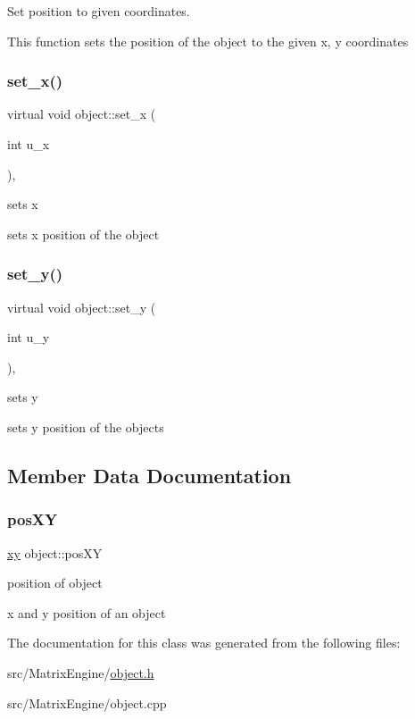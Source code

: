Set position to given coordinates. 

This function sets the position of the object to the given x, y coordinates \mbox{\label{classobject_a0520ed913c351f67b3abc458a5896833}} 
\subsubsection{\texorpdfstring{set\+\_\+x()}{set\_x()}}
{\footnotesize\ttfamily virtual void object\+::set\+\_\+x (\begin{DoxyParamCaption}\item[{int}]{u\+\_\+x }\end{DoxyParamCaption})\hspace{0.3cm}{\ttfamily [inline]}, {\ttfamily [virtual]}}



sets x 

sets x position of the object \mbox{\label{classobject_af2831ab422aedd6671aa894d78bb5288}} 
\subsubsection{\texorpdfstring{set\+\_\+y()}{set\_y()}}
{\footnotesize\ttfamily virtual void object\+::set\+\_\+y (\begin{DoxyParamCaption}\item[{int}]{u\+\_\+y }\end{DoxyParamCaption})\hspace{0.3cm}{\ttfamily [inline]}, {\ttfamily [virtual]}}



sets y 

sets y position of the objects 

\subsection{Member Data Documentation}
\mbox{\label{classobject_a7fc771aa9781b84b7ee9d222c9bfa605}} 
\subsubsection{\texorpdfstring{pos\+XY}{posXY}}
{\footnotesize\ttfamily \hyperlink{classxy}{xy} object\+::pos\+XY\hspace{0.3cm}{\ttfamily [protected]}}



position of object 

x and y position of an object 

The documentation for this class was generated from the following files\+:\begin{DoxyCompactItemize}
\item 
src/\+Matrix\+Engine/\hyperlink{object_8h}{object.\+h}\item 
src/\+Matrix\+Engine/object.\+cpp\end{DoxyCompactItemize}
